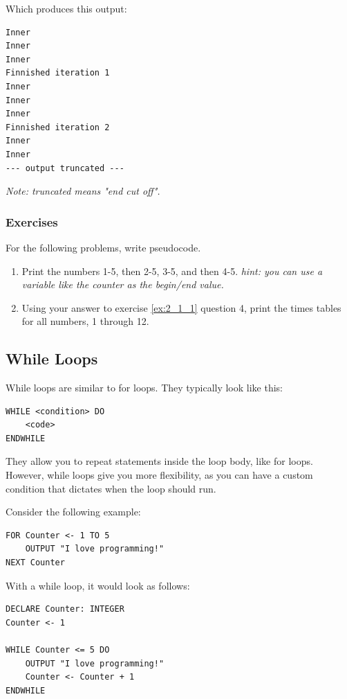 \documentclass[./main.tex]{subfiles}
\begin{document}
Which produces this output:

\begin{verbatim}
Inner
Inner
Inner
Finnished iteration 1
Inner
Inner
Inner
Finnished iteration 2
Inner
Inner
--- output truncated ---
\end{verbatim}
\emph{Note: truncated means "end cut off".}

\newpage
\subsubsection{Exercises}
\label{ex:2_2_1}

For the following problems, write pseudocode.

\begin{enumerate}
    \item Print the numbers 1-5, then 2-5, 3-5, and then 4-5. \emph{hint: you can use a variable like the counter as the begin/end value.}
        \mediumlines

    \item Using your answer to exercise \ref{ex:2_1_1} question 4, print the times tables for all numbers, 1 through 12.
        \mediumlines
\end{enumerate}

\newpage
\subsection{While Loops}

While loops are similar to for loops. They typically look like this:

\begin{verbatim}
WHILE <condition> DO
    <code>
ENDWHILE
\end{verbatim}

They allow you to repeat statements inside the loop body, like for loops. However, while loops give you more flexibility, as you can have a custom condition that dictates when the loop should run.

Consider the following example:

\begin{verbatim}
FOR Counter <- 1 TO 5
    OUTPUT "I love programming!"
NEXT Counter
\end{verbatim}

With a while loop, it would look as follows:

\begin{verbatim}
DECLARE Counter: INTEGER
Counter <- 1
 
WHILE Counter <= 5 DO
    OUTPUT "I love programming!"
    Counter <- Counter + 1
ENDWHILE
\end{verbatim}
\end{document}
